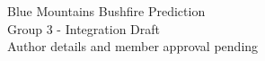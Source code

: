 \documentclass[10pt,a4paper]{article}
\begin{document}
\begin{center}\Large Blue Mountains Bushfire Prediction\\
\normalsize Group 3 - Integration Draft\\
Author details and member approval pending\end{center}



\end{document}
